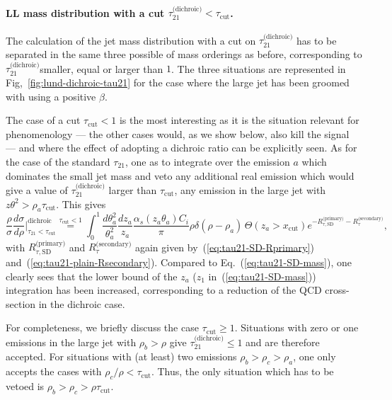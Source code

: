 \paragraph{LL mass distribution with a cut $\tau_{21}^\text{(dichroic)}<\tau_\text{cut}$.}
%
The calculation of the jet mass distribution with a cut on
$\tau_{21}^\text{(dichroic)}$ has to be separated in the same three
possible of mass orderings as before, corresponding to
$\tau_{21}^\text{(dichroic)}$smaller, equal or larger than $1$.
%
The three situations are represented in
Fig,~\ref{fig:lund-dichroic-tau21} for the case where the large jet
has been groomed with \SD using a positive $\beta$.

The case of a cut $\tau_\text{cut}<1$ is the most interesting as it is
the situation relevant for phenomenology --- the other cases would, as we
show below, also kill the signal --- and where the effect of adopting
a dichroic ratio can be explicitly seen. As for the case of the
standard $\tau_{21}$, one as to integrate over the emission $a$ which
dominates the small jet mass and veto any additional real emission
which would give a value of $\tau_{21}^\text{(dichroic)}$ larger than
$\tau_\text{cut}$, \ie any emission in the large jet with
$z\theta^2>\rho_a\tau_\text{cut}$. This gives
\begin{equation}\label{eq:distrib-tau21dichroic-less1}
  \frac{\rho}{\sigma} \frac{d\sigma}{d\rho}\Big|_{\tau_{21}<\tau_\text{cut}}^\text{dichroic}
  \overset{\tau_\text{cut}<1}{=}
  \int_0^1 \frac{d\theta_a^2}{\theta_a^2}\frac{dz_a}{z_a}
  \frac{\alpha_s(z_a\theta_a)C_i}{\pi}\rho\delta(\rho-\rho_a)
  \,\Theta(z_a>x_\text{cut})
  e^{-R_{\tau,\text{SD}}^\text{(primary)}-R_\tau^\text{(secondary)}},
\end{equation}
with $R_{\tau,\text{SD}}^\text{(primary)}$ and
$R_\tau^\text{(secondary)}$ again given
by~(\ref{eq:tau21-SD-Rprimary}) and~(\ref{eq:tau21-plain-Rsecondary}).
%
Compared to Eq.~(\ref{eq:tau21-SD-mass}), one clearly sees that the
lower bound of the $z_a$ ($z_1$ in~(\ref{eq:tau21-SD-mass}))
integration has been increased, corresponding to a reduction of the
QCD cross-section in the dichroic case.

For completeness, we briefly discuss the case $\tau_\text{cut}\ge 1$.
%
Situations with zero or one emissions in the large jet with
$\rho_b>\rho$ give $\tau_{21}^\text{(dichroic)}\le 1$ and are
therefore accepted. For situations with (at least) two emissions
$\rho_b>\rho_c>\rho_a$, one only accepts the cases with
$\rho_c/\rho<\tau_\text{cut}$.
%
Thus, the only situation which has to be vetoed is
$\rho_b>\rho_c>\rho\tau_\text{cut}$.

